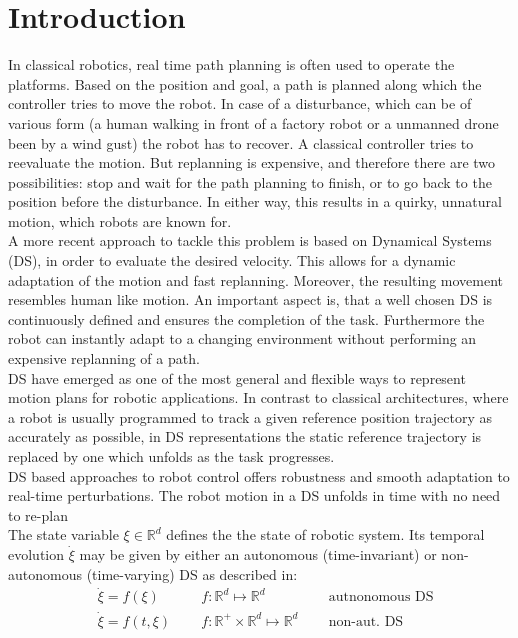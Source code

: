 
\section{Introduction} \label{sec:introduction}
In classical robotics, real time path planning is often used to operate the platforms. Based on the position and goal, a path is planned along which the controller tries to move the robot. In case of a disturbance, which can be of various form (a human walking in front of a factory robot or a unmanned drone been by a wind gust) the robot has to recover. A classical controller tries to reevaluate the motion. But replanning is expensive, and therefore there are two possibilities: stop and wait for the path planning to finish, or to go back to the position before the disturbance. In either way, this results in a quirky, unnatural motion, which robots are  known for. \\
A more recent approach to tackle this problem is based on Dynamical Systems (DS), in order to evaluate the desired velocity. This allows for a dynamic adaptation of the motion and fast replanning. Moreover, the resulting movement resembles human like motion. An important aspect is, that a well chosen DS is continuously defined and ensures the completion of the task. Furthermore the robot can instantly adapt to a changing environment without performing an expensive replanning of a path.\\

DS have emerged as one of the most general and flexible ways to represent motion plans for robotic applications. In contrast to classical architectures, where a robot is usually programmed to track a given reference position trajectory as accurately as possible, in DS representations the static reference trajectory is replaced by one which unfolds as the task progresses. \\
DS based approaches to robot control offers robustness and smooth adaptation to real-time perturbations. The robot motion in a DS unfolds in time with no need to re-plan \cite{khansari2012dynamical} \\
The state variable $\xi  \in \mathbb{R}^d $ defines the the state of robotic system. Its temporal evolution $\dot \xi$ may be given by either an autonomous (time-invariant) or non-autonomous (time-varying) DS as described in:
\begin{align} \label{eq:DS_sys}
  &\dot \xi = f(\xi) & \;\; & f: \mathbb{R}^d \mapsto \mathbb{R}^d & \;\; & \text{autnonomous DS}\label{eq:DS_sys} \\
  &\dot \xi = f(t,\xi)& \;\; &  f: \mathbb{R}^+ \times \mathbb{R}^d \mapsto \mathbb{R}^d & \;\; &  \text{non-aut. DS} \label{eq:DS_sys2}
\end{align}

